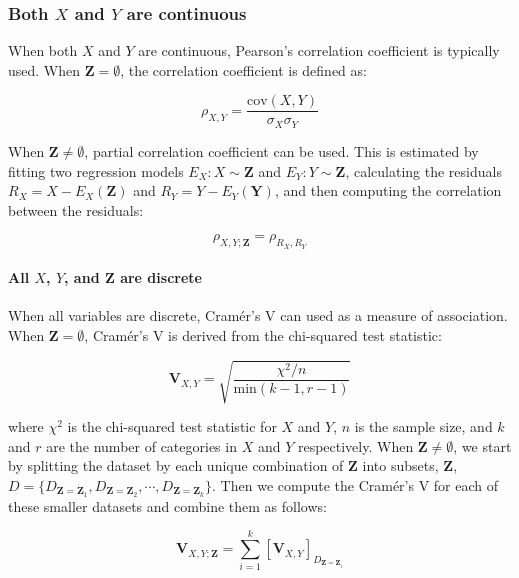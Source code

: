 \documentclass{uai2025} %
\begin{document}
\subsubsection{Both $ X $ and $ Y $ are continuous}
When both $ X $ and $ Y $ are continuous, Pearson's correlation coefficient is
typically used. When $ \bm{Z} = \emptyset $, the correlation
coefficient is defined as:

\begin{equation}
	\rho_{X, Y} = \frac{\mathrm{cov}(X, Y)}{\sigma_X \sigma_Y}
\end{equation}

When $ \bm{Z} \neq \emptyset $, partial correlation coefficient can be used.
This is estimated by fitting two regression models $ E_X: X \sim \bm{Z} $ and $
E_Y: Y \sim \bm{Z} $, calculating the residuals $ R_X = X - E_X(\bm{Z}) $ and $
R_Y = Y - E_Y(\bm{Y}) $, and then computing the correlation between the
residuals:

\begin{equation}
	\rho_{X, Y; \bm{Z}} = \rho_{R_X, R_Y}
\end{equation}

\paragraph{All $ X $, $ Y $, and $ \bm{Z} $ are discrete}

When all variables are discrete, Cram\'er's V can used as a measure of
association. When $ \bm{Z} = \emptyset $, Cram\'er's V is derived from the 
chi-squared test statistic:

\begin{equation}
	\mathbf{V}_{X, Y} = \sqrt{\frac{\chi^2 / n}{\mathrm{min}(k-1, r-1)}}
\end{equation}

where $ \chi^2 $ is the chi-squared test statistic for $ X $ and $ Y $, $ n $
is the sample size, and $ k $ and $ r $ are the number of categories in $ X $
and $ Y $ respectively. When $ \bm{Z} \neq \emptyset $, we start by splitting
the dataset by each unique combination of $ \bm{Z} $ into subsets,  $ \bm{Z} $,
$ D = \{ D_{\bm{Z} = \bm{Z}_1}, D_{\bm{Z} = \bm{Z}_2}, \cdots, D_{\bm{Z} =
\bm{Z}_k} \} $. Then we compute the Cram\'er's V for each of these smaller datasets
and combine them as follows:

\begin{equation}
	\mathbf{V}_{X, Y; \bm{Z}} = \sum_{i=1}^{k} \left[ \mathbf{V}_{X, Y} \right]_{D_{\bm{Z} = \bm{Z}_i}} 
\end{equation}
\end{document}
